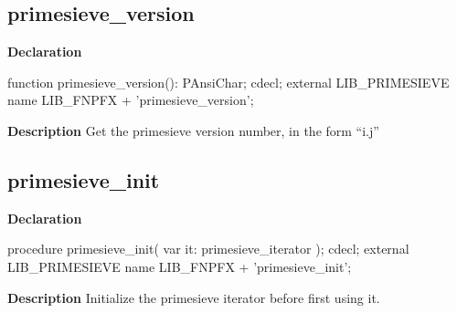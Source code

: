 \documentclass{report}
\newif\ifpdf
\begin{document}
\subsection*{primesieve{\_}version}
\fi
\label{primesieve-primesieve_version}
\begin{list}{}{
\setlength{\itemindent}{0cm}
\setlength{\listparindent}{0cm}
\setlength{\leftmargin}{\evensidemargin}
\addtolength{\leftmargin}{\tmplength}
\settowidth{\labelsep}{X}
\addtolength{\leftmargin}{\labelsep}
\setlength{\labelwidth}{\tmplength}
}
\item[\textbf{Declaration}\hfill]
\ifpdf
\begin{flushleft}
\fi
\begin{ttfamily}
function primesieve{\_}version(): PAnsiChar; cdecl; external LIB{\_}PRIMESIEVE name LIB{\_}FNPFX + 'primesieve{\_}version';\end{ttfamily}

\ifpdf
\end{flushleft}
\fi

\par
\item[\textbf{Description}]
Get the primesieve version number, in the form “i.j”

\end{list}
\ifpdf
\subsection*{\large{\textbf{primesieve{\_}init}}\normalsize\hspace{1ex}\hrulefill}
\else
\subsection*{primesieve{\_}init}
\fi
\label{primesieve-primesieve_init}
\begin{list}{}{
\setlength{\itemindent}{0cm}
\setlength{\listparindent}{0cm}
\setlength{\leftmargin}{\evensidemargin}
\addtolength{\leftmargin}{\tmplength}
\settowidth{\labelsep}{X}
\addtolength{\leftmargin}{\labelsep}
\setlength{\labelwidth}{\tmplength}
}
\item[\textbf{Declaration}\hfill]
\ifpdf
\begin{flushleft}
\fi
\begin{ttfamily}
procedure primesieve{\_}init( var it: primesieve{\_}iterator ); cdecl; external LIB{\_}PRIMESIEVE name LIB{\_}FNPFX + 'primesieve{\_}init';\end{ttfamily}

\ifpdf
\end{flushleft}
\fi

\par
\item[\textbf{Description}]
Initialize the primesieve iterator before first using it.

\end{list}
\ifpdf
\end{document}
